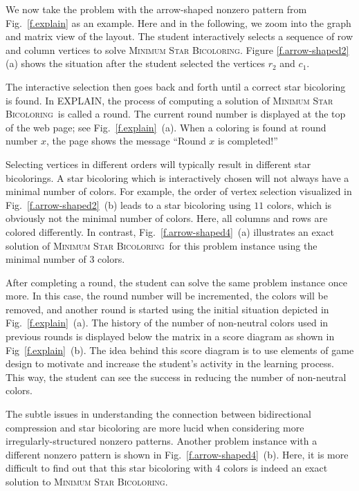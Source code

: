 \documentclass[12pt, twoside,a4paper,toc=bibliography]{scrbook}
\newcommand{\MinStaBic}{\textsc{Minimum Star Bicoloring}}
\begin{document}
We now take the problem with the arrow-shaped nonzero pattern from Fig.~\ref{f.explain}
as an example. Here and in the following, we zoom into the graph and matrix view of the
layout. The student interactively selects a sequence of row and column vertices to solve
\MinStaBic. Figure \ref{f.arrow-shaped2} (a) shows the situation after the student
selected the vertices $r_2$ and $c_1$.

The interactive selection then goes back and forth until a correct star bicoloring is
found. In EXPLAIN, the process of computing a solution of \MinStaBic\ is called a round.
The current round number is displayed at the top of the web page; see
Fig.~\ref{f.explain}~(a). When a coloring is found at round number $x$, the page shows
the message ``Round $x$ is completed!''

Selecting vertices in different orders will typically result in different star
bicolorings. A star bicoloring which is interactively chosen will not always have a
minimal number of colors. For example, the order of vertex selection visualized in
Fig.~\ref{f.arrow-shaped2}~(b) leads to a star bicoloring using $11$ colors, which is
obviously not the minimal number of colors. Here, all columns and rows are colored
differently. In contrast, Fig.~\ref{f.arrow-shaped4}~(a) illustrates an exact solution of
\MinStaBic\ for this problem instance using the minimal number of $3$ colors.

After completing a round, the student can solve the same problem instance once more. In
this case, the round number will be incremented, the colors will be removed, and another
round is started using the initial situation depicted in Fig.~\ref{f.explain}~(a). The
history of the number of non-neutral colors used in previous rounds is displayed below
the matrix in a score diagram as shown in Fig~\ref{f.explain}~(b). The idea behind this
score diagram is to use elements of game design to motivate and increase the student's
activity in the learning process. This way, the student can see the success
in reducing the number of non-neutral colors.

The subtle issues in understanding the connection between bidirectional compression and
star bicoloring are more lucid when considering more irregularly-structured nonzero
patterns. Another problem instance with a different nonzero pattern is shown in
Fig.~\ref{f.arrow-shaped4}~(b). Here, it is more difficult to find out that this star
bicoloring with $4$ colors is indeed an exact solution to \MinStaBic.
\end{document}

